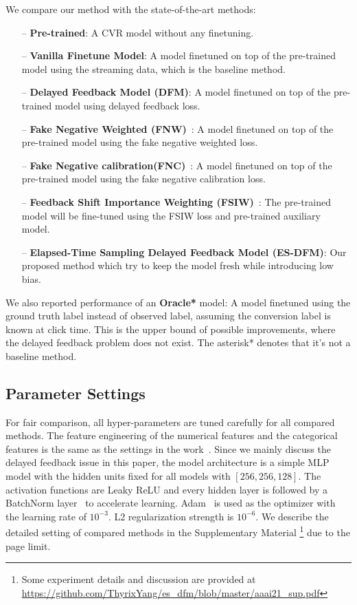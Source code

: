 \documentclass[letterpaper]{article}
\newcommand{\modelname}{Elapsed-Time Sampling Delayed Feedback Model}
\newcommand{\modelnameabb}{ES-DFM}
\begin{document}
We compare our method with the state-of-the-art methods:

\begin{itemize}

\item[--] \textbf{Pre-trained}: A CVR model without any finetuning.

\item[--] \textbf{Vanilla Finetune Model}: A model finetuned on top of the pre-trained model using the streaming data, which is the baseline method.

\item[--] \textbf{Delayed Feedback Model (DFM)}\cite{DFM}: A model finetuned on top of the pre-trained model using delayed feedback loss.

\item[--] \textbf{Fake Negative Weighted (FNW)}~\cite{FNW}: A model finetuned on top of the pre-trained model using the fake negative weighted loss.

\item[--] \textbf{Fake Negative calibration(FNC)}~\cite{FNW}: A model finetuned on top of the pre-trained model using the fake negative calibration loss.

\item[--] \textbf{Feedback Shift Importance Weighting (FSIW)}~\cite{FSIW}: The pre-trained model will be fine-tuned using the FSIW loss and pre-trained auxiliary model.

\item[--] \textbf{\modelname{} (\modelnameabb{})}: Our proposed method which try to keep the model fresh while introducing low bias.

\end{itemize}

We also reported performance of an \textbf{Oracle*} model: A model finetuned using the ground truth label instead of observed label, assuming the conversion label is known at click time. This is the upper bound of possible improvements, where the delayed feedback problem does not exist. The asterisk* denotes that it's not a baseline method.

\subsection{Parameter Settings}
For fair comparison, all hyper-parameters are tuned carefully for all compared methods. The feature engineering of the numerical features and the categorical features is the same as the settings in the work~\cite{DFM}. Since we mainly discuss the delayed feedback issue in this paper, the model architecture is a simple MLP model with the hidden units fixed for all models with $[256,256,128]$. The activation functions are Leaky ReLU and every hidden layer is followed by a BatchNorm layer~\cite{ioffe2015batch} to accelerate learning. Adam~\cite{kingma:adam} is used as the optimizer with the learning rate of $10^{-3}$. L2 regularization strength is $10^{-6}$. We describe the detailed setting of compared methods in the Supplementary Material \footnote{\label{supp}Some experiment details and discussion are provided at \url{https://github.com/ThyrixYang/es_dfm/blob/master/aaai21_sup.pdf}} due to the page limit.
\end{document}
